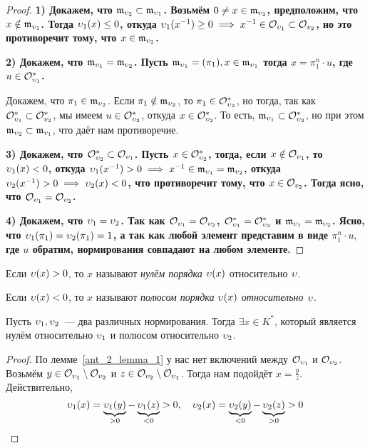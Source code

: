 	\begin{proof}
		\bf{1)} Докажем, что $\mathfrak{m}_{\upsilon_2} \subset \mathfrak{m}_{\upsilon_{1}}$. Возьмём $0 \neq x \in \mathfrak{m}_{\upsilon_{2}}$, предположим, что $x \notin \mathfrak{m}_{\upsilon_{1}}$. Тогда $\upsilon_{1}(x) \le 0$, откуда $\upsilon_{1}(x^{-1})\ge 0 \implies x^{-1} \in \mathcal{O}_{\upsilon_{1}} \subset \mathcal{O}_{v_{2}}$, но это противоречит тому, что $x \in \mathfrak{m}_{\upsilon_{2}}$.

		\bf{2)} Докажем, что $\mathfrak{m}_{\upsilon_{1}} = \mathfrak{m}_{\upsilon_2}$. Пусть $\mathfrak{m}_{\upsilon_{1}} = (\pi_1), x \in \mathfrak{m}_{\upsilon_{1}}$ тогда $x = \pi_1^n \cdot u$, где $u \in \mathcal{O}_{\upsilon_{1}}^{*}$. 

		Докажем, что $\pi_1 \in \mathfrak{m}_{\upsilon_{2}}$. Если $\pi_1 \notin \mathfrak{m}_{\upsilon_{2}}$, то $\pi_1 \in \mathcal{O}_{\upsilon_{2}}^{*}$, но тогда, так как $\mathcal{O}_{\upsilon_1}^* \subset \mathcal{O}_{v_{2}}^{*}$, мы имеем $u \in \mathcal{O}_{\upsilon_2}^*$, откуда $x \in \mathcal{O}_{\upsilon_{2}}^*$. То есть, $\mathfrak{m}_{\upsilon_1} \subset \mathcal{O}_{\upsilon_2}^*$, но при этом $\mathfrak{m}_{\upsilon_{2}} \subset \mathfrak{m}_{v_{1}}$, что даёт нам противоречие. 

		\bf{3)} Докажем, что $\mathcal{O}_{\upsilon_{2}}^* \subset \mathcal{O}_{\upsilon_1}$. Пусть $x \in \mathcal{O}_{\upsilon_2}^*$, тогда, если $x \notin \mathcal{O}_{\upsilon_1}$, то $\upsilon_1(x) < 0$, откуда $\upsilon_1(x^{-1}) > 0 \implies x^{-1} \in \mathfrak{m}_{\upsilon_1} = \mathfrak{m}_{v_2}$, откуда $\upsilon_2(x^{-1}) > 0 \implies \upsilon_{2}(x) < 0$, что противоречит тому, что $x \in \mathcal{O}_{v_2}$. Тогда ясно, что $\mathcal{O}_{\upsilon_{1}} = \mathcal{O}_{\upsilon_2}$. 

		\bf{4)} Докажем, что $\upsilon_1 = \upsilon_2$. Так как $\mathcal{O}_{\upsilon_{1}} = \mathcal{O}_{\upsilon_2}$, $\mathcal{O}_{\upsilon_1}^* = \mathcal{O}_{\upsilon_2}^*$ и $\mathfrak{m}_{\upsilon_1} = \mathfrak{m}_{\upsilon_2}$. Ясно, что $\upsilon_{1}(\pi_1) = \upsilon_2(\pi_1) = 1$, а так как любой элемент представим в виде $\pi_1^n \cdot u,$ где $u$ обратим, нормирования совпадают на любом элементе.  
	\end{proof}

	\begin{definition} 
		Если $\upsilon(x) > 0$, то $x$ называют \emph{нулём порядка $\upsilon(x)$}  относительно $\upsilon$.

		Если $\upsilon(x) < 0$, то $x$ называют \emph{полюсом порядка $\upsilon(x)$ относительно $\upsilon$}.
	\end{definition}

	\begin{lemma}\label{ant_2_lemma_2}  
		Пусть $\upsilon_1, \upsilon_2$~--- два различных нормирования. Тогда $\exists x \in K^{*}$, который является нулём относительно $\upsilon_1$ и полюсом относительно $\upsilon_2$. 
	\end{lemma}
	\begin{proof}
		По лемме~\ref{ant_2_lemma_1} у нас нет включений между $\mathcal{O}_{\upsilon_1}$ и $\mathcal{O}_{\upsilon_2}$. Возьмём $y \in \mathcal{O}_{\upsilon_1} \setminus \mathcal{O}_{\upsilon_2}$ и $z \in \mathcal{O}_{\upsilon_2} \setminus \mathcal{O}_{\upsilon_1}$. Тогда нам подойдёт $x = \frac{y}{z}$. Действительно, 
		\[
			\upsilon_1(x) = \underbrace{\upsilon_1(y)}_{> 0} - \underbrace{\upsilon_1(z)}_{< 0} > 0, \quad \upsilon_2(x) = \underbrace{\upsilon_2(y)}_{< 0} - \underbrace{\upsilon_2(z)}_{> 0} > 0
		\]
	\end{proof}

